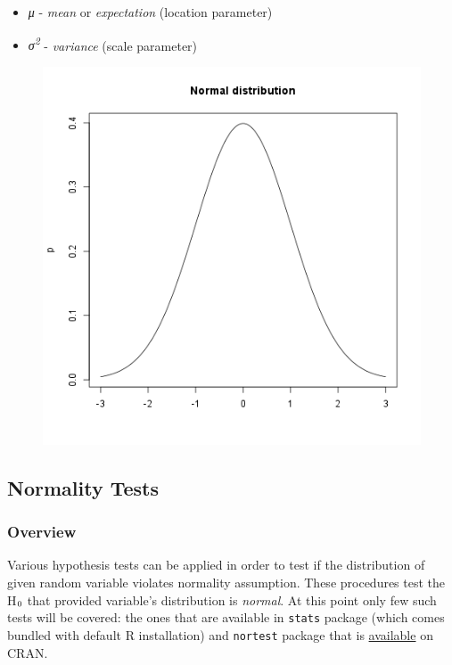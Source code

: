 \documentclass[]{article}
\makeatletter
\def\maxwidth{\ifdim\Gin@nat@width>\linewidth\linewidth
\else\Gin@nat@width\fi}
\let\Oldincludegraphics\includegraphics
\renewcommand{\includegraphics}[1]{\Oldincludegraphics[width=\maxwidth]{#1}}
\newcommand{\textsubscr}[1]{\ensuremath{_{\scriptsize\textrm{#1}}}}
\makeatother
\begin{document}
\begin{itemize}
\item
  \emph{μ} - \emph{mean} or \emph{expectation} (location parameter)
\item
  \emph{σ\textsuperscript{2}} - \emph{variance} (scale parameter)
\end{itemize}
\begin{figure}[htbp]
\centering
\includegraphics{2f8c434e103f36ec70966b372838d448.png}
\caption{}
\end{figure}

\subsection{Normality Tests}

\subsubsection{Overview}

Various hypothesis tests can be applied in order to test if the
distribution of given random variable violates normality assumption.
These procedures test the H\textsubscr{0} that provided variable's
distribution is \emph{normal}. At this point only few such tests will be
covered: the ones that are available in \texttt{stats} package (which
comes bundled with default R installation) and \texttt{nortest} package
that is
\href{http://cran.r-project.org/web/packages/nortest/index.html}{available}
on CRAN.
\end{document}
